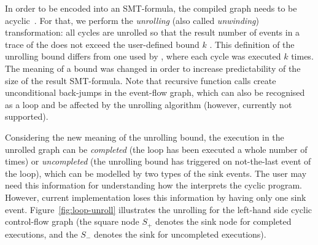 In order to be encoded into an SMT-formula, the compiled graph needs to be acyclic~\cite{Porthos17b}.
For that, we perform the \textit{unrolling} (also called \textit{unwinding}) transformation: all cycles are unrolled so that the result number of events in a trace of the \xgraph{} does not exceed the user-defined bound $k$%
%
%
.
This definition of the unrolling bound differs from one used by \porthos[1], where each cycle was executed $k$ times.
The meaning of a bound was changed in order to increase predictability of the size of the result SMT-formula.
Note that recursive function calls create unconditional back-jumps in the event-flow graph, which can also be recognised as a loop and be affected by the unrolling algorithm (however, currently not supported).

Considering the new meaning of the unrolling bound, the execution in the unrolled graph can be \textit{completed} (the loop has been executed a whole number of times) or \textit{uncompleted} (the unrolling bound has triggered on not-the-last event of the loop), which can be modelled by two types of the sink events.
The user may need this information for understanding how the \porthos[2] interprets the cyclic program.
However, current implementation loses this information by having only one sink event.
Figure~\ref{fig:loop-unroll} illustrates the unrolling for the left-hand side cyclic control-flow graph (the square node $S_{+}$ denotes the sink node for completed executions, and the $S_{-}$ denotes the sink for uncompleted executions).

